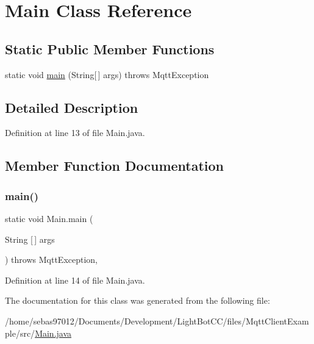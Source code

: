 \hypertarget{class_main}{}\section{Main Class Reference}
\label{class_main}
\subsection*{Static Public Member Functions}
\begin{DoxyCompactItemize}
\item 
static void \mbox{\hyperlink{class_main_a8a5d0f827edddff706cc0e6740d0579a}{main}} (String\mbox{[}$\,$\mbox{]} args)  throws Mqtt\+Exception 
\end{DoxyCompactItemize}


\subsection{Detailed Description}


Definition at line 13 of file Main.\+java.



\subsection{Member Function Documentation}
\mbox{\label{class_main_a8a5d0f827edddff706cc0e6740d0579a}} 
\subsubsection{\texorpdfstring{main()}{main()}}
{\footnotesize\ttfamily static void Main.\+main (\begin{DoxyParamCaption}\item[{String \mbox{[}$\,$\mbox{]}}]{args }\end{DoxyParamCaption}) throws Mqtt\+Exception\hspace{0.3cm}{\ttfamily [inline]}, {\ttfamily [static]}}



Definition at line 14 of file Main.\+java.



The documentation for this class was generated from the following file\+:\begin{DoxyCompactItemize}
\item 
/home/sebas97012/\+Documents/\+Development/\+Light\+Bot\+C\+C/files/\+Mqtt\+Client\+Example/src/\mbox{\hyperlink{files_2_mqtt_client_example_2src_2_main_8java}{Main.\+java}}\end{DoxyCompactItemize}
